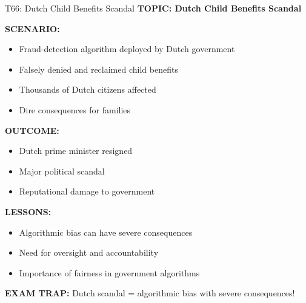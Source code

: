 \documentclass[8pt]{beamer}
\begin{document}
	\begin{frame}{T66: Dutch Child Benefits Scandal}
		\fontsize{6.5}{7.5}\selectfont
		\textbf{TOPIC: Dutch Child Benefits Scandal}
		
		\vspace{0.1cm}
		\textbf{SCENARIO:}
		\begin{itemize}
			\item Fraud-detection algorithm deployed by Dutch government
			\item Falsely denied and reclaimed child benefits
			\item Thousands of Dutch citizens affected
			\item Dire consequences for families
		\end{itemize}
		
		\vspace{0.1cm}
		\textbf{OUTCOME:}
		\begin{itemize}
			\item Dutch prime minister resigned
			\item Major political scandal
			\item Reputational damage to government
		\end{itemize}
		
		\vspace{0.1cm}
		\textbf{LESSONS:}
		\begin{itemize}
			\item Algorithmic bias can have severe consequences
			\item Need for oversight and accountability
			\item Importance of fairness in government algorithms
		\end{itemize}
		
		\textcolor{myred}{\textbf{EXAM TRAP:}} Dutch scandal = \textcolor{myblue}{algorithmic bias with severe consequences}!
	\end{frame}
	
\end{document}
